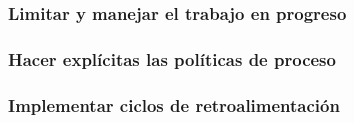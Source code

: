 


\subsubsection{Limitar y manejar el trabajo en progreso}
\subsubsection{Hacer explícitas las políticas de proceso}



\subsubsection{Implementar ciclos de retroalimentación}

